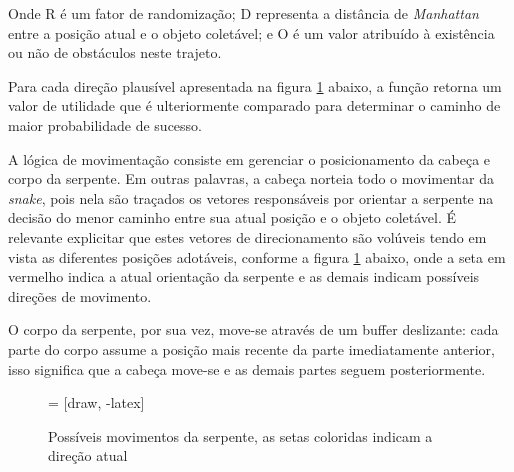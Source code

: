 \documentclass[conference]{IEEEtran}
\begin{document}
Onde R é um fator de randomização; D representa a distância de \textit{Manhattan} entre a posição atual e o objeto coletável; e O é um valor atribuído à existência ou não de obstáculos neste trajeto.

Para cada direção plausível apresentada na figura \ref{fig:snakeHeadPositions} abaixo, a função retorna um valor de utilidade que é ulteriormente comparado para determinar o caminho de maior probabilidade de sucesso.

A lógica de movimentação consiste em gerenciar o posicionamento da cabeça e corpo da serpente.  Em outras palavras, a cabeça norteia todo o movimentar da \textit{snake}, pois nela são traçados os vetores responsáveis por orientar a serpente na decisão do menor caminho entre sua atual posição e o objeto coletável. É relevante explicitar que estes vetores de direcionamento são volúveis tendo em vista as diferentes posições adotáveis, conforme a figura \ref{fig:snakeHeadPositions} abaixo, onde a seta em vermelho indica a atual orientação da serpente e as demais indicam possíveis direções de movimento.

O corpo da serpente, por sua vez, move-se através de um buffer deslizante: cada parte do corpo assume a posição mais recente da parte imediatamente anterior, isso significa que a cabeça move-se e as demais partes seguem posteriormente.

\begin{figure}[H]
\centering
{} = [draw, -latex]

\caption{Possíveis movimentos da serpente, as setas coloridas indicam a direção atual}
\label{fig:snakeHeadPositions}
\end{figure}
\end{document}
